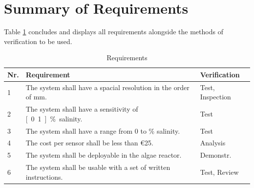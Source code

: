 \section{Summary of Requirements}

Table \ref{tab:req} concludes and displays all requirements alongside the methods of verification to be used.

\begin{table}[H]
    \centering

    \caption[Requirements]{Requirements}
    \label{tab:req}
    \begin{tabular}{lp{}l}
        	\toprule
        	Nr. & Requirement & Verification \tabularnewline
        	\midrule
		1 & The system shall have a spacial resolution in the order of \unit[10]{mm}. & Test, Inspection \tabularnewline
		2 & The system shall have a sensitivity of  \unit[0.1]{\%} salinity.  & Test \tabularnewline
		3 & The system shall have a range from 0 to \unit[5]{\%} salinity.  & Test \tabularnewline
		4 & The cost per sensor shall be less than \euro{25}.  & Analysis \tabularnewline
		5 & The system shall be deployable in the algae reactor. & Demonstr. \tabularnewline
		6 & The system shall be usable with a set of written instructions. & Test, Review \tabularnewline
        \bottomrule
    \end{tabular}
\end{table}